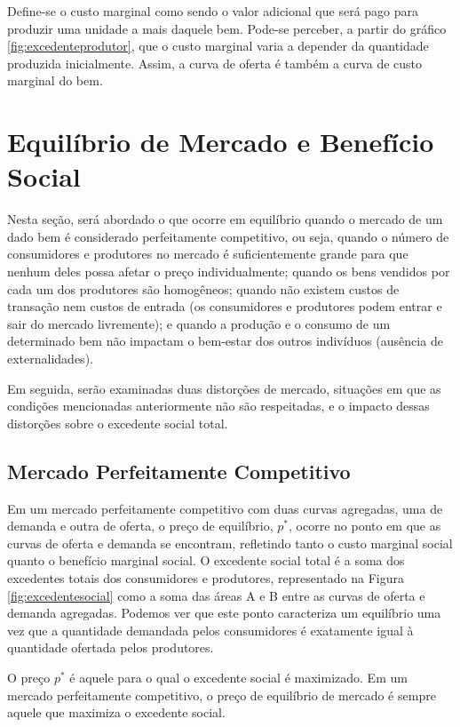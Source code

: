 \documentclass[12pt,letterpaper]{article}
\newcommand{\1}{\mathbbm{1}}
\numberwithin{equation}{section}
\begin{document}
Define-se o custo marginal como sendo o valor adicional que será pago para produzir uma unidade a mais daquele bem. Pode-se perceber, a partir do gráfico \ref{fig:excedenteprodutor}, que o custo marginal varia a depender da quantidade produzida inicialmente. Assim, a curva de oferta é também a curva de custo marginal do bem.

\section{Equilíbrio de Mercado e Benefício Social}

Nesta seção, será abordado o que ocorre em equilíbrio quando o mercado de um dado bem é considerado perfeitamente competitivo, ou seja, quando o número de consumidores e produtores no mercado é suficientemente grande para que nenhum deles possa afetar o preço individualmente; quando os bens vendidos por cada um dos produtores são homogêneos; quando não existem custos de transação nem custos de entrada (os consumidores e produtores podem entrar e sair do mercado livremente); e quando a produção e o consumo de um determinado bem não impactam o bem-estar dos outros indivíduos (ausência de externalidades).

Em seguida, serão examinadas duas distorções de mercado, situações em que as condições mencionadas anteriormente não são respeitadas, e o impacto dessas distorções sobre o excedente social total.

\subsection{Mercado Perfeitamente Competitivo}

Em um mercado perfeitamente competitivo com duas curvas agregadas, uma de demanda e outra de oferta, o preço de equilíbrio, $p^{*}$, ocorre no ponto em que as curvas de oferta e demanda se encontram, refletindo tanto o custo marginal social quanto o benefício marginal social. O excedente social total é a soma dos excedentes totais dos consumidores e produtores, representado na Figura \ref{fig:excedentesocial} como a soma das áreas A e B entre as curvas de oferta e demanda agregadas. Podemos ver que este ponto caracteriza um equilíbrio uma vez que a quantidade demandada pelos consumidores é exatamente igual à quantidade ofertada pelos produtores.

O preço $p^{*}$ é aquele para o qual o excedente social é maximizado. Em um mercado perfeitamente competitivo, o preço de equilíbrio de mercado é sempre aquele que maximiza o excedente social.
\end{document}

